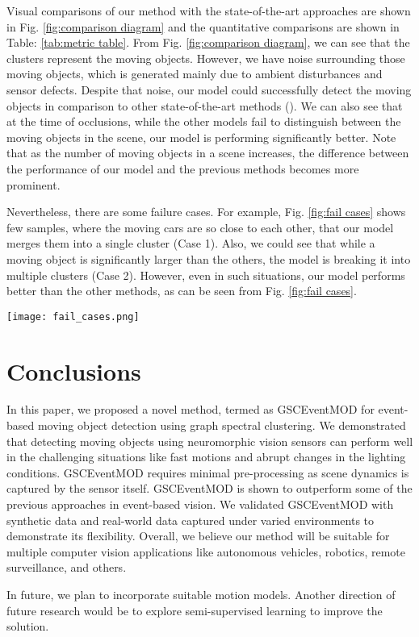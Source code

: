 \documentclass{article}
\begin{document}
Visual comparisons of our method with the state-of-the-art approaches are shown in Fig. \ref{fig:comparison diagram} and the quantitative comparisons are shown in Table: \ref{tab:metric table}. From Fig. \ref{fig:comparison diagram}, we can see that the clusters represent the moving objects. However, we have noise surrounding those moving objects, which is generated mainly due to ambient disturbances and sensor defects. Despite that noise, our model could successfully detect the moving objects in comparison to other state-of-the-art methods (\cite{pikatkowska2012spatiotemporal,chen2018neuromorphic,hinz2017online}). We can also see that at the time of occlusions, while the other models fail to distinguish between the moving objects in the scene, our model is performing significantly better. Note that as the number of moving objects in a scene increases, the difference between the performance of our model and the previous methods becomes more prominent. 

Nevertheless, there are some failure cases. For example, Fig. \ref{fig:fail cases} shows few samples, where the moving cars are so close to each other, that our model merges them into a single cluster (Case 1). Also, we could see that while a moving object is significantly larger than the others, the model is breaking it into multiple clusters (Case 2). However, even in such situations, our model performs better than the other methods, as can be seen from Fig. \ref{fig:fail cases}.

\begin{figure*}
\begin{center}
\texttt{[image: fail\_cases.png]}
\end{center}
   \caption{Some failure cases in GSCEventMOD and other SOTA methods. Case 1: When the moving objects are too close to each other.  Case 2: When one of the moving objects is significantly larger than all the others.}
   \label{fig:fail cases}
\end{figure*}

\section{Conclusions}
In this paper, we proposed a novel method, termed as GSCEventMOD for event-based moving object detection using graph spectral clustering. We demonstrated that detecting moving objects using neuromorphic vision sensors can perform well in the challenging situations like fast motions and abrupt changes in the lighting conditions. GSCEventMOD requires minimal pre-processing as scene dynamics is captured by the sensor itself. GSCEventMOD is shown to outperform some of the previous approaches in event-based vision. We validated GSCEventMOD with synthetic data and real-world data captured under varied environments to demonstrate its flexibility. Overall, we believe our method will be suitable for multiple computer vision applications like autonomous vehicles, robotics, remote surveillance, and others.

In future, we plan to incorporate suitable motion models. Another direction of future research would be to explore semi-supervised learning to improve the solution.  



  
\end{document}
